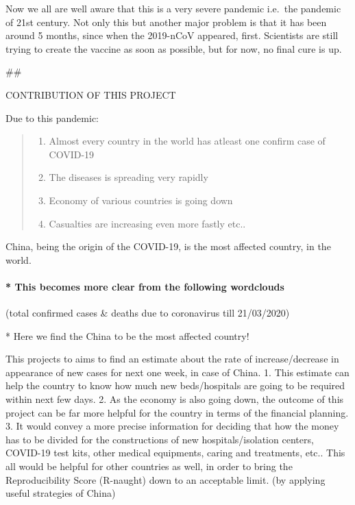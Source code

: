 \documentclass[11pt]{article}
\providecommand{\tightlist}{%
      \setlength{\itemsep}{0pt}\setlength{\parskip}{0pt}}
\begin{document}
     Now we all are well aware that this is a very severe pandemic i.e.~the
pandemic of 21st century. Not only this but another major problem is
that it has been around 5 months, since when the 2019-nCoV appeared,
first. Scientists are still trying to create the vaccine as soon as
possible, but for now, no final cure is up.

 

    \#\#

CONTRIBUTION OF THIS PROJECT

     Due to this pandemic:

\begin{quote}
\begin{enumerate}
\def\labelenumi{\arabic{enumi}.}
\tightlist
\item
  Almost every country in the world has atleast one confirm case of
  COVID-19
\item
  The diseases is spreading very rapidly
\item
  Economy of various countries is going down
\item
  Casualties are increasing even more fastly etc..
\end{enumerate}
\end{quote}

China, being the origin of the COVID-19, is the most affected country,
in the world.

    \hypertarget{this-becomes-more-clear-from-the-following-wordclouds}{%
\paragraph{* This becomes more clear from the following
wordclouds}\label{this-becomes-more-clear-from-the-following-wordclouds}}

(total confirmed cases \& deaths due to coronavirus till 21/03/2020) 

    * Here we find the China to be the most affected country!

     This projects to aims to find an estimate about the rate of
increase/decrease in appearance of new cases for next one week, in case
of China. 1. This estimate can help the country to know how much new
beds/hospitals are going to be required within next few days. 2. As the
economy is also going down, the outcome of this project can be far more
helpful for the country in terms of the financial planning. 3. It would
convey a more precise information for deciding that how the money has to
be divided for the constructions of new hospitals/isolation centers,
COVID-19 test kits, other medical equipments, caring and treatments,
etc.. This all would be helpful for other countries as well, in order to
bring the Reproducibility Score (R-naught) down to an acceptable limit.
(by applying useful strategies of China) 
\end{document}
